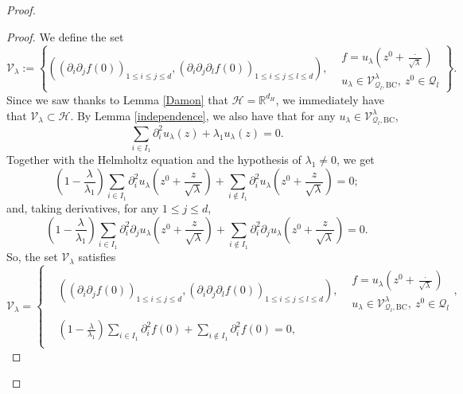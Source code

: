 \documentclass{amsart}
\theoremstyle{definition}
\theoremstyle{remark}
\renewcommand\leq\leqslant
\numberwithin{equation}{section}
\theoremstyle{definition}
\theoremstyle{remark}
\begin{document}
\begin{proof}
\begin{proof}
        We define the set \begin{equation}
			\mathcal{V}_\lambda:=\left\{\left(\left(\partial_{i}\partial_{j}f(0)\right)_{1\leq i\leq j\leq d},\left(\partial_{i}\partial_{j}\partial_{l}f(0)\right)_{1\leq i\leq j\leq l\leq d}\right),\begin{aligned}
				& f=u_\lambda\left(z^0+\frac{\cdot}{\sqrt{\lambda}}\right)\\& u_\lambda\in\mathcal{V}_{\mathcal{Q}_l,\mathrm{BC}}^\lambda,\ z^0\in\mathcal{Q}_l
			\end{aligned}\right\}.
		\end{equation}Since we saw thanks to Lemma \ref{Damon} that $\mathcal{H}=\mathbb{R}^{d_H}$, we immediately have that   $\mathcal{V}_\lambda\subset\mathcal{H}$. By Lemma \ref{independence}, we also have that for any $u_\lambda\in\mathcal{V}_{\mathcal{Q}_l,\mathrm{BC}}^\lambda$, \begin{equation}
			\sum_{i\in I_1}\partial_{i}^2u_\lambda(z)+\lambda_1u_\lambda(z)=0.
		\end{equation} 
		Together with the Helmholtz equation and the hypothesis of $\lambda_1\neq 0$, we get \begin{equation}
			\left(1-\frac{\lambda}{\lambda_1}\right)\sum_{i\in I_1}\partial_{i}^2u_\lambda\left(z^0+\frac{z}{\sqrt{\lambda}}\right)+\sum_{i\notin I_1}\partial_{i}^2u_\lambda\left(z^0+\frac{z}{\sqrt{\lambda}}\right)=0;
		\end{equation}and, taking derivatives, for any $1\leq j\leq d$, \begin{equation}
			\left(1-\frac{\lambda}{\lambda_1}\right)\sum_{i\in I_1}\partial_{i}^2\partial_{j}u_\lambda\left(z^0+\frac{z}{\sqrt{\lambda}}\right)+\sum_{i\notin I_1}\partial_{i}^2\partial_{j}u_\lambda\left(z^0+\frac{z}{\sqrt{\lambda}}\right)=0.
		\end{equation}So, the set $\mathcal{V}_\lambda$ satisfies \begin{equation}
			\mathcal{V}_\lambda=\left\{\begin{aligned}&\left(\left(\partial_{i}\partial_{j}f(0)\right)_{1\leq i\leq j\leq d},\left(\partial_{i}\partial_{j}\partial_{l}f(0)\right)_{1\leq i\leq j\leq l\leq d}\right),\begin{aligned}
					& f=u_\lambda\left(z^0+\frac{\cdot}{\sqrt{\lambda}}\right)\\& u_\lambda\in \mathcal{V}_{\mathcal{Q}_l,\mathrm{BC}}^\lambda,\ z^0\in\mathcal{Q}_l
				\end{aligned},\\&
				\left(1-\frac{\lambda}{\lambda_1}\right)\sum_{i\in I_1}\partial_{i}^2f(0)+\sum_{i\notin I_1}\partial_{i}^2f(0)=0,\\&

\end{aligned}
\end{equation}
\end{proof}
\end{proof}
\end{document}
